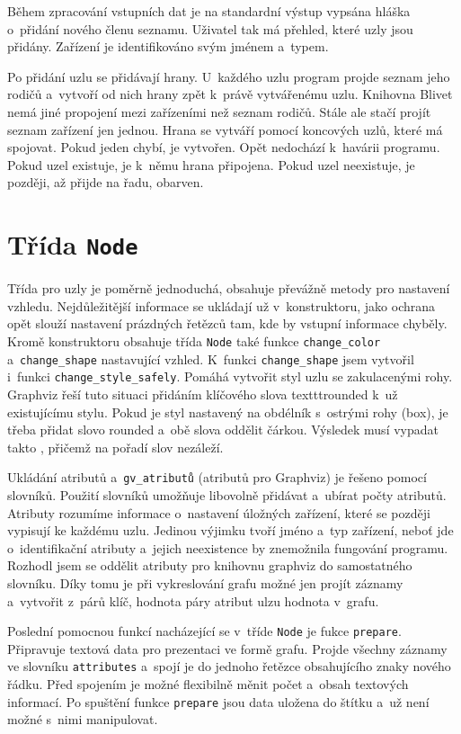 \documentclass[color,table,oneside,nolot,nolof]{fithesis}
\begin{document}
	Během zpracování vstupních dat je na
	standardní výstup vypsána hláška o~přidání nového členu seznamu. Uživatel tak má přehled, které uzly jsou přidány. Zařízení je identifikováno svým jménem a~typem.

	Po přidání uzlu se přidávají hrany. U~každého uzlu program projde seznam jeho rodičů a~vytvoří od nich hrany zpět k~právě vytvářenému uzlu. 
	Knihovna Blivet nemá jiné propojení mezi zařízeními než seznam rodičů. Stále ale stačí projít seznam zařízení jen jednou. Hrana se vytváří pomocí koncových uzlů, které má spojovat.
	Pokud jeden chybí, je vytvořen. Opět nedochází k~havárii programu. Pokud uzel existuje, je k~němu hrana připojena. Pokud uzel neexistuje, je později, až přijde na řadu, obarven.

\section{Třída \texttt{Node}}
	Třída pro uzly je poměrně jednoduchá, obsahuje převážně metody pro nastavení vzhledu. Nejdůležitější informace se ukládají už v~konstruktoru, jako ochrana opět slouží nastavení
	prázdných řetězců tam, kde by vstupní informace chyběly. Kromě konstruktoru obsahuje třída \texttt{Node} také funkce \texttt{change\_color} a~\texttt{change\_shape} nastavující vzhled. K~funkci 
	\texttt{change\_shape} 
	jsem vytvořil i~funkci \texttt{change\_style\_safely}. Pomáhá vytvořit styl uzlu se zakulacenými rohy. Graphviz řeší tuto situaci přidáním klíčového slova texttt{rounded} k~už 
	existujícímu stylu. Pokud je styl nastavený na obdélník s~ostrými rohy (box), je třeba přidat slovo rounded a~obě slova oddělit čárkou. Výsledek musí vypadat takto ,
	přičemž na pořadí slov nezáleží.

	Ukládání atributů a~\texttt{gv\_atributů} (atributů pro Graphviz) je řešeno pomocí slovníků. Použití slovníků umožňuje libovolně přidávat a~ubírat počty atributů. 
	Atributy rozumíme informace o~nastavení úložných zařízení, které se později vypisují ke každému uzlu. Jedinou výjimku tvoří jméno a~typ zařízení, neboť jde
	o~identifikační atributy a~jejich neexistence by znemožnila fungování programu. Rozhodl jsem se oddělit atributy pro knihovnu graphviz do samostatného slovníku. Díky tomu je při
	vykreslování grafu možné jen projít záznamy a~vytvořit z~párů klíč, hodnota páry atribut ulzu hodnota v~grafu. 

	Poslední pomocnou funkcí nacházející se v~tříde \texttt{Node} je fukce \texttt{prepare}. Připravuje textová data pro prezentaci ve formě grafu. Projde všechny záznamy ve slovníku \texttt{attributes} a~spojí je do 
	jednoho řetězce obsahujícího znaky nového řádku. Před spojením je možné flexibilně měnit počet a~obsah textových informací. Po spuštění funkce \texttt{prepare} jsou data uložena do štítku a~už není možné
	s~nimi manipulovat.
\end{document}
